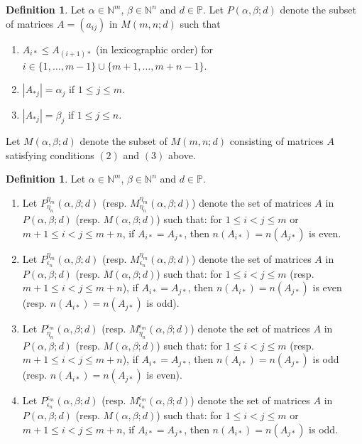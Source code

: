 \documentclass[12pt,reqno]{amsart}
\theoremstyle{definition}
\newtheorem{definition}[theorem]{Definition}
\theoremstyle{remark}
\begin{document}

\begin{definition}
Let $\alpha\in \mathbb{N}^{m}$, $\beta\in \mathbb{N}^{n}$ and $d\in\mathbb{P}$. Let $P(\alpha,\beta;d)$ denote the subset of matrices $A=(a_{ij})$ in $M(m,n;d)$ such that
\begin{enumerate}
        \item $A_{i*}\leq A_{(i+1)*}$ (in lexicographic order) for $i\in\{1,\dotsc,m-1\}\cup \{m+1,\dotsc,m+n-1\}$. 
        \item $|A_{*j}|=\alpha_{j}$ if $1\leq j\leq m$.
        \item $|A_{*j}|=\beta_{j}$ if $1\leq j\leq n$.
\end{enumerate}
Let $M(\alpha,\beta;d)$ denote the subset of $M(m,n;d)$ consisting of matrices $A$ satisfying conditions $(2)$ and $(3)$ above.
\end{definition}
\begin{definition}\label{refinedSuperMatrices}
    Let $\alpha\in \mathbb{N}^{m}$, $\beta\in \mathbb{N}^{n}$ and $d\in\mathbb{P}$.
    \begin{enumerate}
        \item\label{def1} Let $P^{\eta_{m}}_{\eta_{n}}(\alpha,\beta;d)$ (resp. $M^{\eta_{m}}_{\eta_{n}}(\alpha,\beta;d)$) denote the set of matrices $A$ in $P(\alpha,\beta;d)$ (resp. $M(\alpha,\beta;d)$)  such that:
            for $1\leq i< j\leq m$ or $m+1\leq i< j\leq m+n$, if $A_{i*}=A_{j*}$, then $n(A_{i*})=n(A_{j*})$ is even.
        \item Let $P^{\eta_{m}}_{\epsilon_{n}}(\alpha,\beta;d)$ (resp. $M^{\eta_{m}}_{\epsilon_{n}}(\alpha,\beta;d)$) denote the set of matrices $A$ in $P(\alpha,\beta;d)$ (resp. $M(\alpha,\beta;d)$)  such that: for $1\leq i< j\leq m$ (resp. $m+1\leq i<j\leq m+n$), if $A_{i*}=A_{j*}$, then $n(A_{i*})=n(A_{j*})$ is even (resp. $n(A_{i*})=n(A_{j*})$ is odd).
        \item Let $P^{\epsilon_{m}}_{\eta_{n}}(\alpha,\beta;d)$ (resp. $M^{\epsilon_{m}}_{\eta_{n}}(\alpha,\beta;d)$) denote the set of matrices $A$ in $P(\alpha,\beta;d)$ (resp. $M(\alpha,\beta;d)$) such that: for $1\leq i< j\leq m$ (resp. $m+1\leq i<j\leq m+n$), if $A_{i*}=A_{j*}$, then $n(A_{i*})=n(A_{j*})$ is odd (resp. $n(A_{i*})=n(A_{j*})$ is even).
        \item Let $P^{\epsilon_{m}}_{\epsilon_{n}}(\alpha,\beta;d)$ (resp. $M^{\epsilon_{m}}_{\epsilon_{n}}(\alpha,\beta;d)$) denote the set of matrices $A$ in $P(\alpha,\beta;d)$ (resp. $M(\alpha,\beta;d)$)  such that: for $1\leq i< j\leq m$ or $m+1\leq i< j\leq m+n$, if $A_{i*}=A_{j*}$, then  $n(A_{i*})=n(A_{j*})$ is odd.
    \end{enumerate}
\end{definition}
\end{document}
